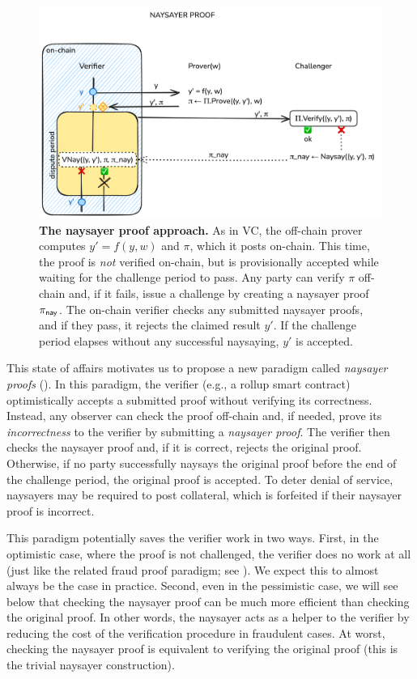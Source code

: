  \begin{figure}[tb]
    \includegraphics[width=\textwidth]{naysayer/figs/naysayer.png}
    \caption{\textbf{The naysayer proof approach.} As in VC, the off-chain prover computes $y' = f(y, w)$ and $\pi$, which it posts on-chain. This time, the proof is \emph{not} verified on-chain, but is provisionally accepted while waiting for the challenge period to pass. Any party can verify $\pi$ off-chain and, if it fails, issue a challenge by creating a naysayer proof $\pi_{\mathsf{nay}}$. The on-chain verifier checks any submitted naysayer proofs, and if they pass, it rejects the claimed result $y'$. If the challenge period elapses without any successful naysaying, $y'$ is accepted.}
    \label{fig:naysayer}
 \end{figure}

This state of affairs motivates us to propose a new paradigm called \emph{naysayer proofs} (). In this paradigm, the verifier (e.g., a rollup smart contract) optimistically accepts a submitted proof without verifying its correctness. Instead, any observer can check the proof off-chain and, if needed, prove its \emph{incorrectness} to the verifier by submitting a \emph{naysayer proof}. The verifier then checks the naysayer proof and, if it is correct, rejects the original proof.
Otherwise, if no party successfully naysays the original proof before the end of the challenge period, the original proof is accepted.
To deter denial of service, naysayers may be required to post collateral, which is forfeited if their naysayer proof is incorrect.

This paradigm potentially saves the verifier work in two ways. 
First, in the optimistic case, where the proof is not challenged, the verifier does no work at all (just like the related fraud proof paradigm; see ). We expect this to almost always be the case in practice. Second, even in the pessimistic case, we will see below that checking the naysayer proof can be much more efficient than checking the original proof.
In other words, the naysayer acts as a helper to the verifier by reducing the cost of the verification procedure in fraudulent cases. At worst, checking the naysayer proof is equivalent to verifying the original proof (this is the trivial naysayer construction).

